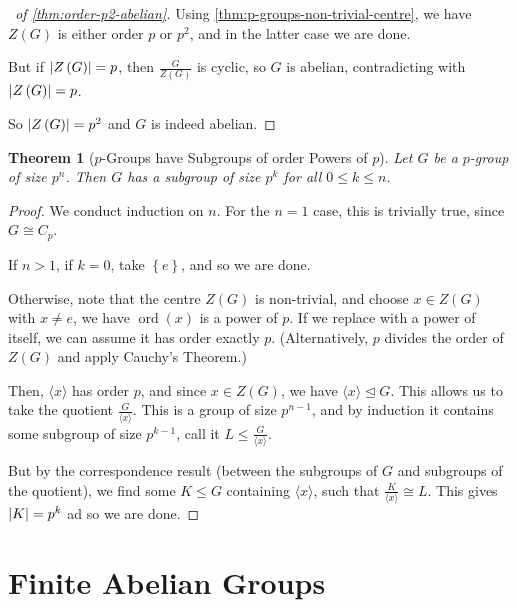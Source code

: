 \documentclass{article}
\newtheorem{theorem}{Theorem}[section]
\theoremstyle{definition}
\theoremstyle{remark}
\DeclarePairedDelimiter{\abs}{\lvert}{\rvert}
\newcommand{\pqty}[1]{\left(#1\right)}
\newcommand{\Bqty}[1]{\left\{#1\right\}}
\newcommand{\angBrac}[1]{\langle #1\rangle}
\newcommand{\flatfrac}[2]{\frac{#1}{#2}}
\newcommand{\isomorphic}{\cong}
\newcommand{\normalsub}{\trianglelefteq}
\newcommand{\subgroup}{\leq}
\newcommand{\ord}{\operatorname{ord}}
\begin{document}
\begin{proof}[\proofname\ of \autoref{thm:order-p2-abelian}]
    Using \autoref{thm:p-groups-non-trivial-centre}, we have \(Z\pqty{G}\) is either order \(p\) or \(p^2\), and in the latter case we are done.

    But if \(\abs{Z\pqty{G}} = p\), then \(\flatfrac{G}{Z\pqty{G}}\) is cyclic, so \(G\) is abelian, contradicting with \(\abs{Z\pqty{G}} = p\).
    
    So \(\abs{Z\pqty{G}} = p^2\) and \(G\) is indeed abelian.
\end{proof}

\begin{theorem}[\(p\)-Groups have Subgroups of order Powers of \(p\)]
    \label{thm:p-group-subgoup-order-power-of-p}
    Let \(G\) be a \(p\)-group of size \(p^n\). Then \(G\) has a subgroup of size \(p^{k}\) for all \(0 \leq k \leq n\).
\end{theorem}

\begin{proof}
    We conduct induction on \(n\). For the \(n = 1\) case, this is trivially true, since \(G \isomorphic C_p\).

    If \(n > 1\), if \(k = 0\), take \(\Bqty{e}\), and so we are done.

    Otherwise, note that the centre \(Z\pqty{G}\) is non-trivial, and choose \(x \in Z(G)\) with \(x \neq e\), we have \(\ord\pqty{x}\) is a power of \(p\). If we replace with a power of itself, we can assume it has order exactly \(p\). (Alternatively, \(p\) divides the order of \(Z\pqty{G}\) and apply Cauchy's Theorem.)

    Then, \(\angBrac{x}\) has order \(p\), and since \(x \in Z\pqty{G}\), we have \(\angBrac{x} \normalsub G\). This allows us to take the quotient \(\flatfrac{G}{\angBrac{x}}\). This is a group of size \(p^{n - 1}\), and by induction it contains some subgroup of size \(p^{k - 1}\), call it \(L \subgroup \flatfrac{G}{\angBrac{x}}\).

    But by the correspondence result (between the subgroups of \(G\) and subgroups of the quotient), we find some \(K \subgroup G\) containing \(\angBrac{x}\), such that \(\flatfrac{K}{\angBrac{x}} \isomorphic L\). This gives \(\abs{K} = p^k\) ad so we are done.
\end{proof}

\section{Finite Abelian Groups}
\end{document}
